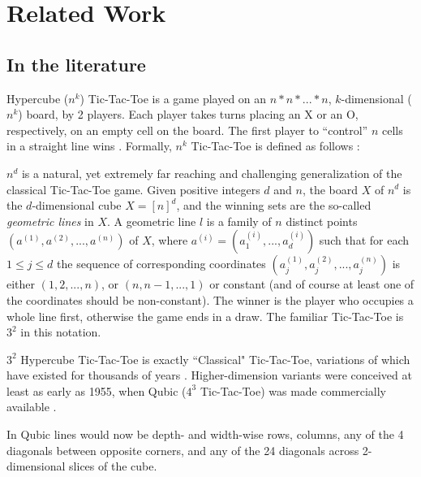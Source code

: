 \documentclass[12pt,a4paper]{article}
\begin{document}
\section{Related Work}

\subsection{In the literature}

Hypercube ($n^k$) Tic-Tac-Toe is a game played on an $n*n*...*n$, $k$-dimensional ($n^k$) board, by 2 players. Each player takes turns placing an X or an O, respectively, on an empty cell on the board. The first player to “control” $n$ cells in a straight line wins \cite{golomb2002hypercube}. 
Formally, $n^k$ Tic-Tac-Toe is defined as follows \cite{hefetz2014positional}:
	\begin{displayquote}
		 $n^d$ is a natural, yet extremely far reaching and challenging generalization of the classical Tic-Tac-Toe game. Given positive integers $d$ and $n$, the board $X$ of $n^d$ is the $d$-dimensional cube $X = [n]^d$, and the winning sets
		are the so-called \textit{geometric lines} in $X$. A geometric line $l$ is a family of $n$ distinct points
		$(a^{(1)}, a^{(2)}, . . . , a^{(n)})$ of $X$, where $a^(i) = (a_1^{(i)}, ..., a_d^{(i)})$ such that for each $1 \leq j \leq d$ the sequence of corresponding coordinates $(a_j^{(1)}, a_j^{(2)}, . . . , a_j^{(n)})$ is either $(1,2,...,n)$, or $(n, n-1, ..., 1)$ or constant (and of course at least one of the coordinates should be non-constant). The winner is the player who occupies a whole line first, otherwise the game ends in a draw. The familiar Tic-Tac-Toe is $3^2$ in this notation.
	\end{displayquote}
$3^2$ Hypercube Tic-Tac-Toe is exactly ``Classical" Tic-Tac-Toe, variations of which have existed for thousands of years \cite{parker1995she}. Higher-dimension variants were conceived at least as early as 1955, when Qubic ($4^3$ Tic-Tac-Toe) was made commercially available \cite{franklin_1955}. 

In Qubic lines would now be depth- and width-wise rows, columns, any of the 4 diagonals between opposite corners, and any of the 24 diagonals across 2-dimensional slices of the cube.
\end{document}
